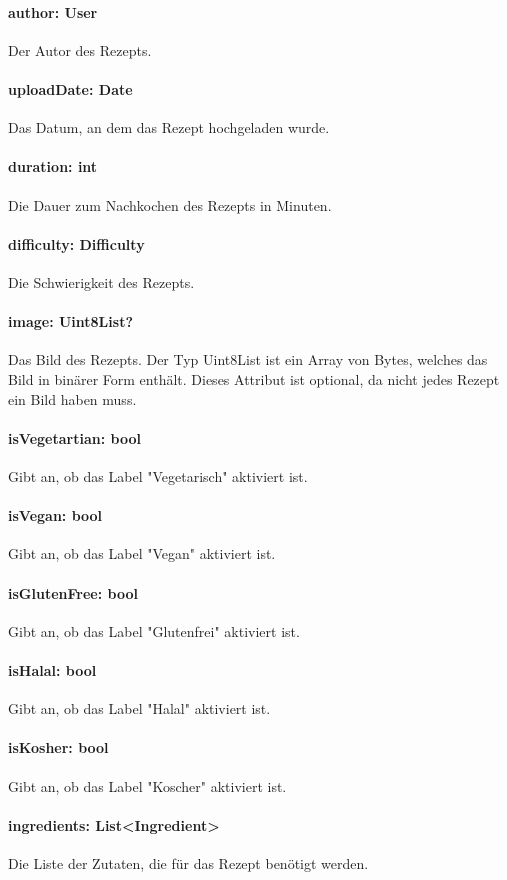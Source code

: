 \documentclass[parskip=full]{scrartcl}
\begin{document}
\paragraph{author: User}
Der Autor des Rezepts.
\paragraph{uploadDate: Date}
Das Datum, an dem das Rezept hochgeladen wurde.
\paragraph{duration: int}
Die Dauer zum Nachkochen des Rezepts in Minuten.
\paragraph{difficulty: Difficulty}
Die Schwierigkeit des Rezepts.
\paragraph{image: Uint8List?}
Das Bild des Rezepts. Der Typ Uint8List ist ein Array von Bytes, welches das Bild in binärer Form enthält. Dieses Attribut ist optional, da nicht jedes Rezept ein Bild haben muss.
\paragraph{isVegetartian: bool}
Gibt an, ob das Label "Vegetarisch" aktiviert ist.
\paragraph{isVegan: bool}
Gibt an, ob das Label "Vegan" aktiviert ist.
\paragraph{isGlutenFree: bool}
Gibt an, ob das Label "Glutenfrei" aktiviert ist.
\paragraph{isHalal: bool}
Gibt an, ob das Label "Halal" aktiviert ist.
\paragraph{isKosher: bool}
Gibt an, ob das Label "Koscher" aktiviert ist.
\paragraph{ingredients: List<Ingredient>}
Die Liste der Zutaten, die für das Rezept benötigt werden.
\end{document}
